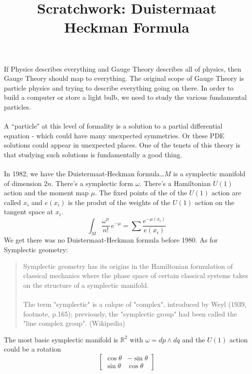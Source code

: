 \documentclass[12pt]{article}
\title{Scratchwork: Duistermaat Heckman Formula}
\date{}
\begin{document}

\sffamily

\maketitle

\noindent If Physics describes everything and Gauge Theory describes all of physics, then Gauge Theory should map to everything.  The original scope of Gauge Theory is particle physics and trying to describe everything going on there.  In order to build a computer or store a light bulb, we need to study the various fundamental particles. \\ \\ 
A ``particle" at this level of formality is a solution to a partial differential equation - which could have many unexpected symmetries.  Or these PDE solutions could appear in unexpected places.  One of the tenets of this theory is that studying such solutions is fundamentally a good thing. \\ \\
In 1982, we have the Duistermaat-Heckman formula\dots $M$ is a symplectic manifold of dimension $2n$. There's a symplectic form $\omega$.  There's a Hamiltonian $U(1)$ action and the moment map $\mu$.  The fixed points of the of the $U(1)$ action are called $x_i$ and $e(x_i)$ is the produt of the weights of the $U(1)$ action on the tangent space at $x_i$.
$$ \int_M \frac{\omega^n}{n!}\, e^{-\mu} = \sum \frac{e^{-\mu(x_i)}}{e(x_i)} $$ 
We get there was no Duistermaat-Heckman formula before 1980.  As for Symplectic geometry:
\begin{quotation}
Symplectic geometry has its origins in the Hamiltonian formulation of classical mechanics where the phase space of certain classical systems takes on the structure of a symplectic manifold. \\ \\
The term "symplectic" is a calque of "complex", introduced by Weyl (1939, footnote, p.165); previously, the "symplectic group" had been called the "line complex group".  (Wikipedia)
\end{quotation}
The most basic symplectic manifold is $\mathbb{R}^2$ with $\omega = dp \wedge dq$ and the $U(1)$ action could be a rotation 
$$\left[\begin{array}{cr} \cos \theta & -\sin \theta \\ \sin \theta & \cos \theta \end{array} \right] $$
\end{document}
